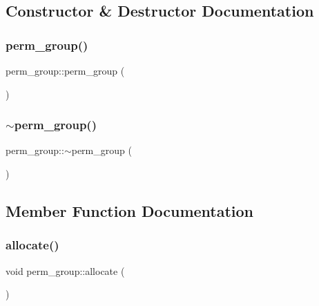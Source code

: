 \subsection{Constructor \& Destructor Documentation}
\mbox{\label{classperm__group_a7c2f0ad47542ce415fc3d23c9d382911}} 
\subsubsection{\texorpdfstring{perm\+\_\+group()}{perm\_group()}}
{\footnotesize\ttfamily perm\+\_\+group\+::perm\+\_\+group (\begin{DoxyParamCaption}{ }\end{DoxyParamCaption})}

\mbox{\label{classperm__group_a7f2df62d0b24cbdb2ee4cfca3bb8d21f}} 
\subsubsection{\texorpdfstring{$\sim$perm\+\_\+group()}{~perm\_group()}}
{\footnotesize\ttfamily perm\+\_\+group\+::$\sim$perm\+\_\+group (\begin{DoxyParamCaption}{ }\end{DoxyParamCaption})}



\subsection{Member Function Documentation}
\mbox{\label{classperm__group_a597c9991f5c1d8b16cc74bcd7003ee73}} 
\subsubsection{\texorpdfstring{allocate()}{allocate()}}
{\footnotesize\ttfamily void perm\+\_\+group\+::allocate (\begin{DoxyParamCaption}{ }\end{DoxyParamCaption})}

